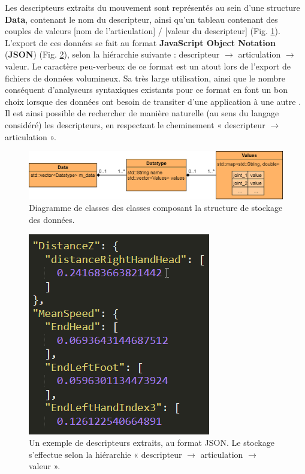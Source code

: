 Les descripteurs extraits du mouvement sont représentés au sein d'une structure \textbf{Data}, contenant le nom du descripteur, ainsi qu'un tableau contenant des couples de valeurs [nom de l'articulation] / [valeur du descripteur] (Fig. \ref{fig:class_diagram_datatype_MLA}). L'export de ces données se fait au format \textbf{JavaScript Object Notation} (\textbf{JSON}) (Fig. \ref{fig:json_data_example}), selon la hiérarchie suivante : descripteur $\rightarrow$ articulation $\rightarrow$ valeur. Le caractère peu-verbeux de ce format est un atout lors de l'export de fichiers de données volumineux. Sa très large utilisation, ainsi que le nombre conséquent d'analyseurs syntaxiques existants pour ce format en font un bon choix lorsque des données ont besoin de transiter d'une application à une autre \parencite{Gao2011JSON}. Il est ainsi possible de rechercher de manière naturelle (au sens du langage considéré) les descripteurs, en respectant le cheminement « descripteur $\rightarrow$ articulation ».

\begin{figure}[h]
    \centering
    \includegraphics[width=\textwidth]{pictures/class_diagram_datatype_MLA.png}
    \caption[Diagramme de classes de la structure de stockage des données]{Diagramme de classes des classes composant la structure de stockage des données.}
    \label{fig:class_diagram_datatype_MLA}
\end{figure}

\begin{figure}[h]
	\centering
    \includegraphics[]{pictures/json_data_example.png}
    \caption[Exemple de descripteurs au format JSON]{Un exemple de descripteurs extraits, au format JSON. Le stockage s'effectue selon la hiérarchie « descripteur $\rightarrow$ articulation $\rightarrow$ valeur ».}
    \label{fig:json_data_example}
\end{figure}

